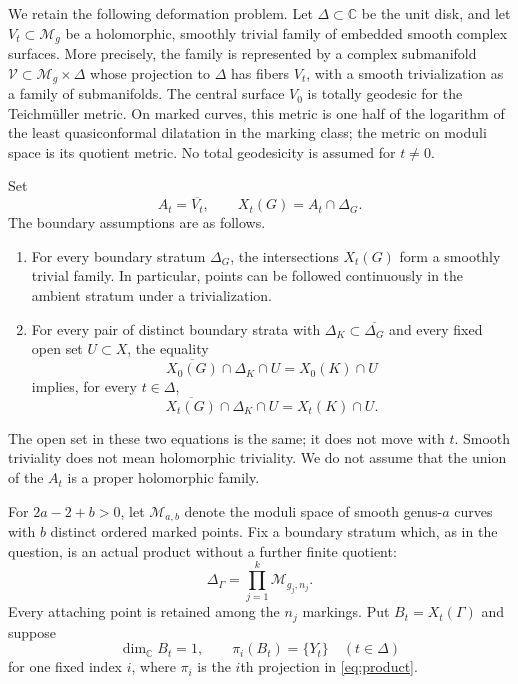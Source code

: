 \documentclass[11pt]{article}
\newcommand{\M}{\mathcal M}
\newcommand{\C}{\mathbb C}
\newcommand{\cl}[1]{\overline{#1}}
\theoremstyle{definition}
\theoremstyle{remark}
\begin{document}
We retain the following deformation problem. Let $\Delta\subset\C$ be the unit disk, and let $V_t\subset\M_g$ be a holomorphic, smoothly trivial family of embedded smooth complex surfaces. More precisely, the family is represented by a complex submanifold $\mathcal V\subset\M_g\times\Delta$ whose projection to $\Delta$ has fibers $V_t$, with a smooth trivialization as a family of submanifolds. The central surface $V_0$ is totally geodesic for the Teichm\"uller metric. On marked curves, this metric is one half of the logarithm of the least quasiconformal dilatation in the marking class; the metric on moduli space is its quotient metric. No total geodesicity is assumed for $t\ne0$.

Set
\[
 A_t=\cl{V_t},\qquad X_t(G)=A_t\cap\Delta_G.
\]
The boundary assumptions are as follows.
\begin{enumerate}[label=(\roman*),leftmargin=*]
\item\label{hyp:trivial} For every boundary stratum $\Delta_G$, the intersections $X_t(G)$ form a smoothly trivial family. In particular, points can be followed continuously in the ambient stratum under a trivialization.
\item\label{hyp:compat} For every pair of distinct boundary strata with $\Delta_K\subset\cl{\Delta_G}$ and every fixed open set $U\subset X$, the equality
\begin{equation}\label{eq:central-incidence}
 \cl{X_0(G)}\cap\Delta_K\cap U=X_0(K)\cap U
\end{equation}
implies, for every $t\in\Delta$,
\begin{equation}\label{eq:deformed-incidence}
 \cl{X_t(G)}\cap\Delta_K\cap U=X_t(K)\cap U.
\end{equation}
\end{enumerate}
The open set in these two equations is the same; it does not move with $t$. Smooth triviality does not mean holomorphic triviality. We do not assume that the union of the $A_t$ is a proper holomorphic family.

For $2a-2+b>0$, let $\M_{a,b}$ denote the moduli space of smooth genus-$a$ curves with $b$ distinct ordered marked points. Fix a boundary stratum which, as in the question, is an actual product without a further finite quotient:
\begin{equation}\label{eq:product}
 \Delta_\Gamma=\prod_{j=1}^k\M_{g_j,n_j}.
\end{equation}
Every attaching point is retained among the $n_j$ markings. Put $B_t=X_t(\Gamma)$ and suppose
\begin{equation}\label{eq:singleton}
 \dim_{\C}B_t=1,\qquad \pi_i(B_t)=\{Y_t\}
 \quad(t\in\Delta)
\end{equation}
for one fixed index $i$, where $\pi_i$ is the $i$th projection in \eqref{eq:product}.
\end{document}
